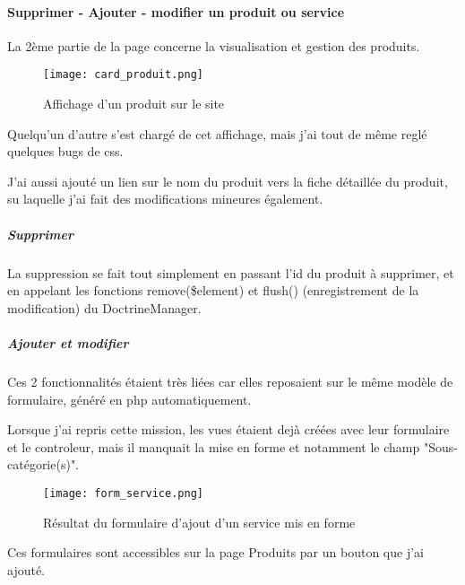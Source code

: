 \paragraph{Supprimer - Ajouter - modifier un produit ou service}

La 2ème partie de la page concerne la visualisation et gestion des produits.

\begin{figure}[H]
    \texttt{[image: card\_produit.png]}
    \caption{Affichage d'un produit sur le site}
\end{figure}

Quelqu'un d'autre s'est chargé de cet affichage, mais j'ai tout de même reglé quelques bugs de css.

J'ai aussi ajouté un lien sur le nom du produit vers la fiche détaillée du produit, su laquelle j'ai fait des modifications mineures également.

\subparagraph*{Supprimer}


La suppression se fait tout simplement en passant l'id du produit à supprimer, et en appelant les fonctions remove(\$element) et flush() (enregistrement de la modification) du DoctrineManager.

\subparagraph*{Ajouter et modifier}


Ces 2 fonctionnalités étaient très liées car elles reposaient sur le même modèle de formulaire, généré en php automatiquement.

Lorsque j'ai repris cette mission, les vues étaient dejà créées avec leur formulaire et le controleur, mais il manquait la mise en forme et notamment le champ "Sous-catégorie(s)".

\begin{figure}[H]
    \texttt{[image: form\_service.png]}
    \caption{Résultat du formulaire d'ajout d'un service mis en forme}
\end{figure}

Ces formulaires sont accessibles sur la page Produits par un bouton que j'ai ajouté.\\

